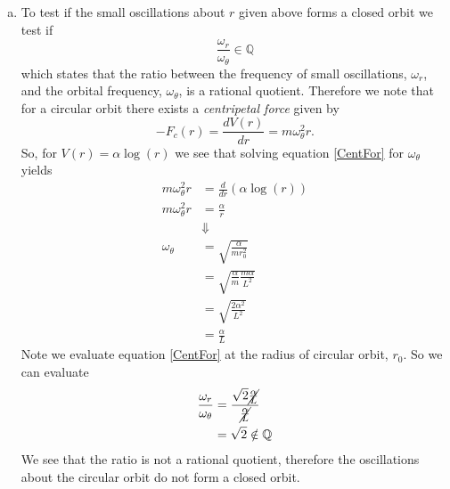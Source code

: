 \documentclass[11pt]{article}
\numberwithin{equation}{section}
\begin{document}
\begin{enumerate}[(a)]
\item To test if the small oscillations about $r$ given above forms a closed orbit we test
if 
$$\frac{\omega_r}{\omega_{\theta}}\in\mathbb{Q}$$
which states that the ratio between the frequency of small oscillations, $\omega_r$, and the 
orbital frequency, $\omega_{\theta}$, is a rational quotient. Therefore we note that for a
circular orbit there exists a \emph{centripetal force} given by
\begin{equation}
-F_c(r) = \frac{dV(r)}{dr} = m\omega_{\theta}^2 r.
\label{CentFor}
\end{equation}
So, for $V(r) = \alpha\log(r)$ we see that solving equation \ref{CentFor} for 
$\omega_{\theta}$ yields
\begin{align*}
m\omega_{\theta}^2 r &=  \frac{d}{dr}\left(\alpha\log(r)\right)\\
m\omega_{\theta}^2 r &=  \frac{\alpha}{r}\\
&\Downarrow\\
\omega_{\theta}  &=  \sqrt{\frac{\alpha}{mr_0^2}}\\
&=  \sqrt{\frac{\alpha}{m}\frac{m\alpha}{L^2}}\\
&=  \sqrt{\frac{2\alpha^2}{L^2}}\\
&=  \frac{\alpha}{L}
\end{align*}
Note we evaluate equation \ref{CentFor} at the radius of circular orbit, $r_0$. So we can
evaluate
\begin{align*}
\frac{\omega_r}{\omega_{\theta}} &= \frac{\sqrt{2}\cancel{\frac{\alpha}{L}}}{\cancel{\frac{\alpha}{L}}}\\
&= \sqrt{2} \notin \mathbb{Q}
\end{align*}
We see that the ratio is not a rational quotient, therefore the oscillations about the 
circular orbit do not form a closed orbit.
\end{enumerate}
\end{document}

